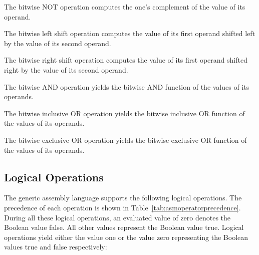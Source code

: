 \begin{itemize}


The bitwise NOT operation computes the one's complement of the value of its operand.


The bitwise left shift operation computes the value of its first operand shifted left by the value of its second operand.


The bitwise right shift operation computes the value of its first operand shifted right by the value of its second operand.


The bitwise AND operation yields the bitwise AND function of the values of its operands.


The bitwise inclusive OR operation yields the bitwise inclusive OR function of the values of its operands.


The bitwise exclusive OR operation yields the bitwise exclusive OR function of the values of its operands.

\end{itemize}

\subsection{Logical Operations}

The generic assembly language supports the following logical operations.
The precedence of each operation is shown in Table~\ref{tab:asmoperatorprecedence}.
During all these logical operations, an evaluated value of zero denotes the Boolean value false.
All other values represent the Boolean value true.
Logical operations yield either the value one or the value zero representing the Boolean values true and false respectively:

